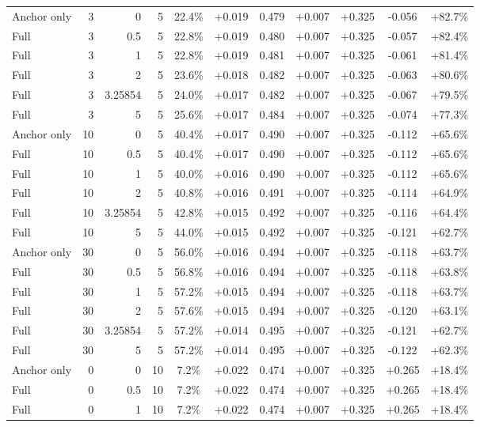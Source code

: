 \begin{table}[htbp]
\begin{tabular}{lrrrccccccc}
Anchor only & 3 & 0 & 5 & 22.4\% & +0.019 & 0.479 & +0.007 & +0.325 & -0.056 & +82.7\% \\
Full & 3 & 0.5 & 5 & 22.8\% & +0.019 & 0.480 & +0.007 & +0.325 & -0.057 & +82.4\% \\
Full & 3 & 1 & 5 & 22.8\% & +0.019 & 0.481 & +0.007 & +0.325 & -0.061 & +81.4\% \\
Full & 3 & 2 & 5 & 23.6\% & +0.018 & 0.482 & +0.007 & +0.325 & -0.063 & +80.6\% \\
Full & 3 & 3.25854 & 5 & 24.0\% & +0.017 & 0.482 & +0.007 & +0.325 & -0.067 & +79.5\% \\
Full & 3 & 5 & 5 & 25.6\% & +0.017 & 0.484 & +0.007 & +0.325 & -0.074 & +77.3\% \\
Anchor only & 10 & 0 & 5 & 40.4\% & +0.017 & 0.490 & +0.007 & +0.325 & -0.112 & +65.6\% \\
Full & 10 & 0.5 & 5 & 40.4\% & +0.017 & 0.490 & +0.007 & +0.325 & -0.112 & +65.6\% \\
Full & 10 & 1 & 5 & 40.0\% & +0.016 & 0.490 & +0.007 & +0.325 & -0.112 & +65.6\% \\
Full & 10 & 2 & 5 & 40.8\% & +0.016 & 0.491 & +0.007 & +0.325 & -0.114 & +64.9\% \\
Full & 10 & 3.25854 & 5 & 42.8\% & +0.015 & 0.492 & +0.007 & +0.325 & -0.116 & +64.4\% \\
Full & 10 & 5 & 5 & 44.0\% & +0.015 & 0.492 & +0.007 & +0.325 & -0.121 & +62.7\% \\
Anchor only & 30 & 0 & 5 & 56.0\% & +0.016 & 0.494 & +0.007 & +0.325 & -0.118 & +63.7\% \\
Full & 30 & 0.5 & 5 & 56.8\% & +0.016 & 0.494 & +0.007 & +0.325 & -0.118 & +63.8\% \\
Full & 30 & 1 & 5 & 57.2\% & +0.015 & 0.494 & +0.007 & +0.325 & -0.118 & +63.7\% \\
Full & 30 & 2 & 5 & 57.6\% & +0.015 & 0.494 & +0.007 & +0.325 & -0.120 & +63.1\% \\
Full & 30 & 3.25854 & 5 & 57.2\% & +0.014 & 0.495 & +0.007 & +0.325 & -0.121 & +62.7\% \\
Full & 30 & 5 & 5 & 57.2\% & +0.014 & 0.495 & +0.007 & +0.325 & -0.122 & +62.3\% \\
Anchor only & 0 & 0 & 10 & 7.2\% & +0.022 & 0.474 & +0.007 & +0.325 & +0.265 & +18.4\% \\
Full & 0 & 0.5 & 10 & 7.2\% & +0.022 & 0.474 & +0.007 & +0.325 & +0.265 & +18.4\% \\
Full & 0 & 1 & 10 & 7.2\% & +0.022 & 0.474 & +0.007 & +0.325 & +0.265 & +18.4\% \\

\end{tabular}
\end{table}
